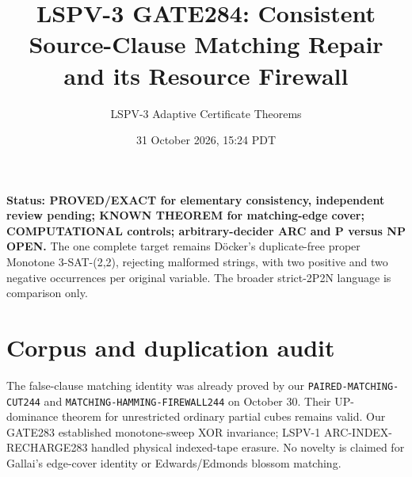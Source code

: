 \documentclass[11pt]{article}
\title{LSPV-3 GATE284: Consistent Source-Clause Matching Repair and its Resource Firewall}
\author{LSPV-3 Adaptive Certificate Theorems}
\date{31 October 2026, 15:24 PDT}
\begin{document}
\maketitle
\noindent\textbf{Status: PROVED/EXACT for elementary consistency, independent review pending; KNOWN THEOREM for matching-edge cover; COMPUTATIONAL controls; arbitrary-decider ARC and P versus NP OPEN.}
The one complete target remains D\"ocker's duplicate-free proper Monotone 3-SAT-(2,2), rejecting malformed strings, with two positive and two negative occurrences per original variable. The broader strict-2P2N language is comparison only.
\section{Corpus and duplication audit}
The false-clause matching identity was already proved by our \texttt{PAIRED-MATCHING-CUT244} and \texttt{MATCHING-HAMMING-FIREWALL244} on October 30. Their UP-dominance theorem for unrestricted ordinary partial cubes remains valid. Our GATE283 established monotone-sweep XOR invariance; LSPV-1 ARC-INDEX-RECHARGE283 handled physical indexed-tape erasure. No novelty is claimed for Gallai's edge-cover identity or Edwards/Edmonds blossom matching.
\end{document}
